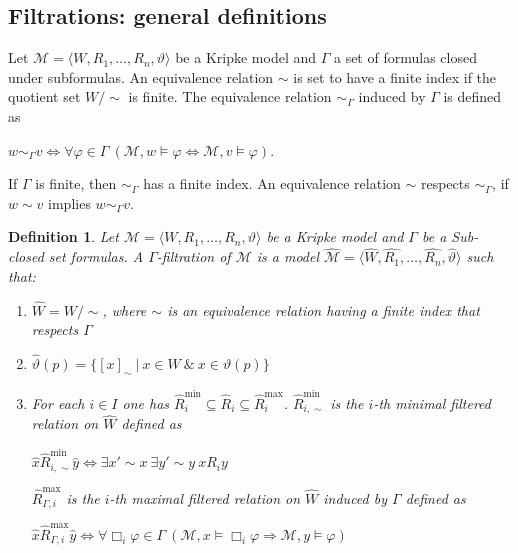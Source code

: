 \documentclass[a4paper]{article}
\theoremstyle{defin}
\newtheorem{defin}{Definition}
\theoremstyle{theorem}
\theoremstyle{prop}
\theoremstyle{lemma}
\theoremstyle{fact}
\theoremstyle{ex}
\theoremstyle{col}
\begin{document}
\subsection{Filtrations: general definitions}

Let $\mathcal{M} = \langle W, R_1, \dots, R_n, \vartheta \rangle$ be a Kripke model and $\Gamma$ a set of formulas closed under subformulas. An equivalence relation $\sim$ is set to have a finite index if the quotient set $W / \sim$ is finite. The equivalence relation $\sim_{\Gamma}$ induced by $\Gamma$ is defined as

\begin{center}
  $w \sim_{\Gamma} v \Leftrightarrow \forall \varphi \in \Gamma \: (\mathcal{M}, w \models \varphi \Leftrightarrow \mathcal{M}, v \models \varphi)$.
\end{center}

If $\Gamma$ is finite, then $\sim_{\Gamma}$ has a finite index. An equivalence relation $\sim$ respects $\sim_{\Gamma}$, if $w \sim v$ implies $w \sim_{\Gamma} v$.

\begin{defin}
  Let $\mathcal{M} = \langle W, R_1, \dots, R_n, \vartheta \rangle$ be a Kripke model and $\Gamma$ be a Sub-closed set formulas. A $\Gamma$-filtration of $\mathcal{M}$ is a model
  $\widehat{\mathcal{M}} = \langle \widehat{W}, \widehat{R_1}, \dots, \widehat{R_n}, \widehat{\vartheta} \rangle$ such that:
  \begin{enumerate}
    \item $\widehat{W} = W / \sim$, where $\sim$ is an equivalence relation having a finite index that respects $\Gamma$
    \item $\widehat{\vartheta}(p) = \{ [x]_{\sim} \: | \: x \in W \: \& \: x \in \vartheta(p)\}$
    \item For each $i \in I$ one has $\widehat{R}_i^{\text{min}} \subseteq \widehat{R}_i \subseteq \widehat{R}_i^{\text{max}}$. $\widehat{R}_{i, \sim}^{\text{min}}$ is the $i$-th minimal filtered relation on $\widehat{W}$ defined as
    \begin{center}
      $\hat{x} \widehat{R}_{i, \sim}^{\text{min}} \hat{y} \Leftrightarrow \exists x' \sim x \: \exists y' \sim y \: x R_i y$
    \end{center}
    $\widehat{R}_{\Gamma,i}^{\text{max}}$ is the $i$-th maximal filtered relation on $\widehat{W}$ induced by $\Gamma$ defined as
    \begin{center}
      $\hat{x} \widehat{R}_{\Gamma,i}^{\text{max}} \hat{y} \Leftrightarrow \forall \Box_i \varphi \in \Gamma \: (\mathcal{M}, x \models \Box_i \varphi \Rightarrow \mathcal{M}, y \models \varphi)$
    \end{center}
  \end{enumerate}
\end{defin}
\end{document}
